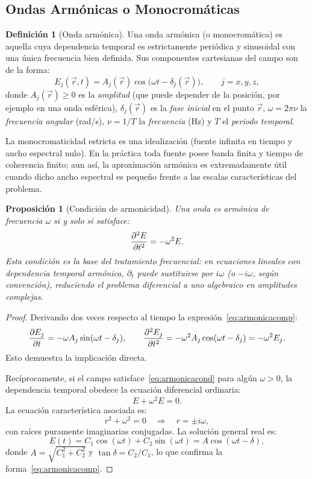 \documentclass[12pt, a4paper]{article}
\theoremstyle{plain}
\newtheorem{proposicion}[teorema]{Proposición}
\theoremstyle{definition}
\newtheorem{definicion}[teorema]{Definición}
\theoremstyle{remark}
\newcommand{\ve}[1]{\vec{#1}}
\begin{document}
\subsection{Ondas Armónicas o Monocromáticas}

\begin{definicion}[Onda armónica]
Una onda armónica (o monocromática) es aquella cuya dependencia temporal es
estrictamente periódica y sinusoidal con una única frecuencia bien definida.
Sus componentes cartesianas del campo son de la forma:
\begin{equation}
  E_j(\ve{r},t) = A_j(\ve{r})\cos\!\bigl(\omega t - \delta_j(\ve{r})\bigr),
  \qquad j = x,y,z, \label{eq:armonicacomp}
\end{equation}
donde $A_j(\ve{r}) \geq 0$ es la \emph{amplitud} (que puede depender de la
posición, por ejemplo en una onda esférica), $\delta_j(\ve{r})$ es la
\emph{fase inicial} en el punto $\ve{r}$, $\omega = 2\pi\nu$ la
\emph{frecuencia angular} (rad/s), $\nu = 1/T$ la \emph{frecuencia} (Hz) y
$T$ el \emph{periodo temporal}.

La monocromaticidad estricta es una idealización (fuente infinita en tiempo y
ancho espectral nulo). En la práctica toda fuente posee banda finita y tiempo
de coherencia finito; aun así, la aproximación armónica es extremadamente útil
cuando dicho ancho espectral es pequeño frente a las escalas características del
problema.
\end{definicion}

\begin{proposicion}[Condición de armonicidad]
Una onda es armónica de frecuencia $\omega$ si y solo si satisface:
\begin{equation}
  \pdv[2]{E}{t} = -\omega^2 E. \label{eq:armonicacond}
\end{equation}
Esta condición es la base del tratamiento frecuencial: en ecuaciones lineales
con dependencia temporal armónica, $\partial_t$ puede sustituirse por
$i\omega$ (o $-i\omega$, según convención), reduciendo el problema diferencial
a uno algebraico en amplitudes complejas.
\end{proposicion}

\begin{proof}
Derivando dos veces respecto al tiempo la expresión~\eqref{eq:armonicacomp}:
\[
  \pdv{E_j}{t} = -\omega A_j\sin(\omega t-\delta_j),
  \qquad
  \pdv[2]{E_j}{t}
  = -\omega^2 A_j\cos(\omega t-\delta_j)
  = -\omega^2 E_j.
\]
Esto demuestra la implicación directa.

Recíprocamente, si el campo satisface~\eqref{eq:armonicacond} para algún
$\omega > 0$, la dependencia temporal obedece la ecuación diferencial ordinaria:
\[
  \ddot E + \omega^2 E = 0.
\]
La ecuación característica asociada es:
\[
  r^2+\omega^2=0 \quad\Rightarrow\quad r=\pm i\omega,
\]
con raíces puramente imaginarias conjugadas. La solución general real es:
\[
  E(t)=C_1\cos(\omega t)+C_2\sin(\omega t)
  = A\cos(\omega t-\delta),
\]
donde $A = \sqrt{C_1^2+C_2^2}$ y $\tan\delta = C_2/C_1$, lo que confirma la
forma~\eqref{eq:armonicacomp}.
\end{proof}
\end{document}
